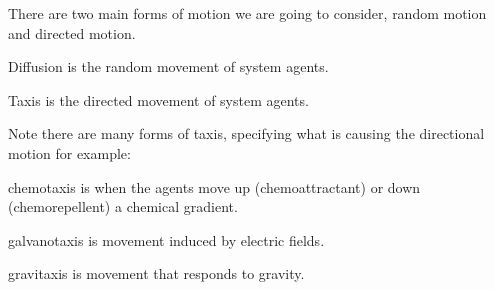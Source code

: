 There are two main forms of motion we are going to consider, random motion and directed motion.
\begin{defin}
Diffusion is the random movement of system agents. 
\end{defin}
\begin{defin}
Taxis is the directed movement of system agents. 
\end{defin}
Note there are many forms of taxis, specifying what is causing the directional motion for example:
\begin{bolditemize}
\item[chemotaxis] is when the agents move up (chemoattractant) or down (chemorepellent) a chemical gradient.
\item[galvanotaxis] is movement induced by electric fields.
\item[gravitaxis] is movement that responds to gravity.
\end{bolditemize}
